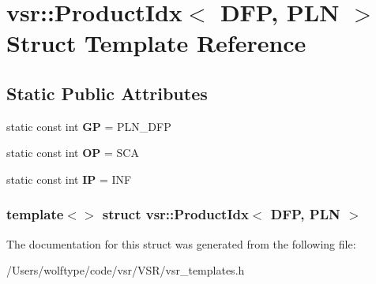 \hypertarget{structvsr_1_1_product_idx_3_01_d_f_p_00_01_p_l_n_01_4}{\section{vsr\-:\-:Product\-Idx$<$ D\-F\-P, P\-L\-N $>$ Struct Template Reference}
\label{structvsr_1_1_product_idx_3_01_d_f_p_00_01_p_l_n_01_4}
}
\subsection*{Static Public Attributes}
\begin{DoxyCompactItemize}
\item 
\hypertarget{structvsr_1_1_product_idx_3_01_d_f_p_00_01_p_l_n_01_4_ad351172e71959b4070f6fe3c14e45e38}{static const int {\bfseries G\-P} = P\-L\-N\-\_\-\-D\-F\-P}\label{structvsr_1_1_product_idx_3_01_d_f_p_00_01_p_l_n_01_4_ad351172e71959b4070f6fe3c14e45e38}

\item 
\hypertarget{structvsr_1_1_product_idx_3_01_d_f_p_00_01_p_l_n_01_4_afde06b14439449137d0a315d2bc99656}{static const int {\bfseries O\-P} = S\-C\-A}\label{structvsr_1_1_product_idx_3_01_d_f_p_00_01_p_l_n_01_4_afde06b14439449137d0a315d2bc99656}

\item 
\hypertarget{structvsr_1_1_product_idx_3_01_d_f_p_00_01_p_l_n_01_4_af5fe337047c35764d7b6f8c7b2b29a9b}{static const int {\bfseries I\-P} = I\-N\-F}\label{structvsr_1_1_product_idx_3_01_d_f_p_00_01_p_l_n_01_4_af5fe337047c35764d7b6f8c7b2b29a9b}

\end{DoxyCompactItemize}
\subsubsection*{template$<$$>$ struct vsr\-::\-Product\-Idx$<$ D\-F\-P, P\-L\-N $>$}



The documentation for this struct was generated from the following file\-:\begin{DoxyCompactItemize}
\item 
/\-Users/wolftype/code/vsr/\-V\-S\-R/vsr\-\_\-templates.\-h\end{DoxyCompactItemize}
